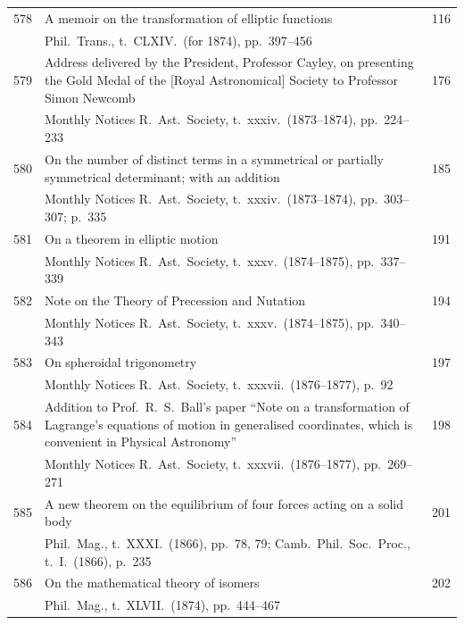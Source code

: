 \documentclass[12pt,a4paper]{article}
\theoremstyle{plain}
\theoremstyle{definition}
\begin{document}
\noindent
\begin{longtable}{r @{. } p{4.8in} r}
578 & A memoir on the transformation of elliptic functions & 116 \\
  & Phil.\ Trans., t.\ CLXIV.\ (for 1874), pp.\ 397--456 & \\ 

579 & Address delivered by the President, Professor Cayley, on presenting the Gold Medal of the [Royal Astronomical] Society to Professor Simon Newcomb & 176 \\
  & Monthly Notices R.\ Ast.\ Society, t.\ xxxiv.\ (1873--1874), pp.\ 224--233 & \\ 

580 & On the number of distinct terms in a symmetrical or partially symmetrical determinant; with an addition & 185 \\
  & Monthly Notices R.\ Ast.\ Society, t.\ xxxiv.\ (1873--1874), pp.\ 303--307; p.\ 335 & \\ 

581 & On a theorem in elliptic motion & 191 \\
  & Monthly Notices R.\ Ast.\ Society, t.\ xxxv.\ (1874--1875), pp.\ 337--339 & \\ 

582 & Note on the Theory of Precession and Nutation & 194 \\
  & Monthly Notices R.\ Ast.\ Society, t.\ xxxv.\ (1874--1875), pp.\ 340--343 & \\ 

583 & On spheroidal trigonometry & 197 \\
  & Monthly Notices R.\ Ast.\ Society, t.\ xxxvii.\ (1876--1877), p.\ 92 & \\ 

584 & Addition to Prof.\ R.\ S.\ Ball's paper ``Note on a transformation of Lagrange's equations of motion in generalised coordinates, which is convenient in Physical Astronomy'' & 198 \\
  & Monthly Notices R.\ Ast.\ Society, t.\ xxxvii.\ (1876--1877), pp.\ 269--271 & \\ 

585 & A new theorem on the equilibrium of four forces acting on a solid body & 201 \\
  & Phil.\ Mag., t.\ XXXI.\ (1866), pp.\ 78, 79; Camb.\ Phil.\ Soc.\ Proc., t.\ I.\ (1866), p.\ 235 & \\ 

586 & On the mathematical theory of isomers & 202 \\
  & Phil.\ Mag., t.\ XLVII.\ (1874), pp.\ 444--467 & \\ 


\end{longtable}
\end{document}
